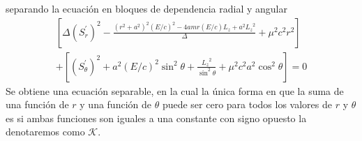 separando la ecuación en bloques de dependencia radial y angular
\begin{equation}
    \begin{aligned}
        \left[\Delta\left(S_r^{\prime}\right)^2-\frac{\left(r^2+a^2\right)^2 (E/c)^2-4 a m r (E/c) {L_z}+a^2 {L_z}^2}{\Delta}+\mu^2 c^2 r^2\right] \\
        +\left[\left(S_\theta^{\prime}\right)^2+a^2 (E/c)^2 \sin ^2 \theta+\frac{{L_z}^2}{\sin ^2 \theta}+\mu^2 c^2 a^2 \cos ^2 \theta\right] = 0
    \end{aligned}
\end{equation}
Se obtiene una ecuación separable, en la cual la única forma en que la suma de una función de $r$ y una función de $\theta$ puede ser cero para todos los valores de $r$ y $\theta$ es si ambas funciones son iguales a una constante con signo opuesto la denotaremos como $\mathcal{K}$.

